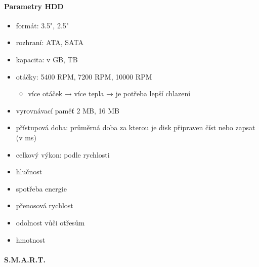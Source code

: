 \documentclass[a4paper,12pt]{article}
\providecommand{\tightlist}{%
\setlength{\itemsep}{0pt}\setlength{\parskip}{0pt}}
\begin{document}
\paragraph{Parametry HDD}

\begin{itemize}
\tightlist
\item formát: 3.5", 2.5"
\item rozhraní: ATA, SATA
\item kapacita: v GB, TB
\item otáčky: 5400 RPM, 7200 RPM, 10000 RPM

  \begin{itemize}
  \tightlist
  \item více otáček → více tepla → je potřeba lepší chlazení
  \end{itemize}
\item vyrovnávací paměť 2 MB, 16 MB
\item přístupová doba: průměrná doba za kterou je disk připraven číst nebo
  zapsat (v ms)
\item celkový výkon: podle rychlosti
\item hlučnost
\item spotřeba energie
\item přenosová rychlost
\item odolnost vůči otřesům
\item hmotnost
\end{itemize}

\paragraph{S.M.A.R.T.}
\end{document}
